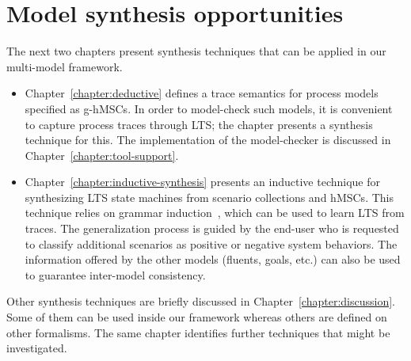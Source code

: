 \section{Model synthesis opportunities\label{section:background-discussion}}

The next two chapters present synthesis techniques that can be applied in our multi-model framework. 

\begin{itemize}
\item Chapter~\ref{chapter:deductive} defines a trace semantics for process models specified as g-hMSCs. In order to model-check such models, it is convenient to capture process traces through LTS; the chapter presents a synthesis technique for this. The implementation of the model-checker is discussed in Chapter~\ref{chapter:tool-support}.
\item Chapter~\ref{chapter:inductive-synthesis} presents an inductive technique for synthesizing LTS state machines from scenario collections and hMSCs. This technique relies on grammar induction~\cite{Gold:1978}, which can be used to learn LTS from traces. The generalization process is guided by the end-user who is requested to classify additional scenarios as positive or negative system behaviors. The information offered by the other models (fluents, goals, etc.) can also be used to guarantee inter-model consistency. 
\end{itemize}

Other synthesis techniques are briefly discussed in Chapter~\ref{chapter:discussion}. Some of them can be used inside our framework whereas others are defined on other formalisms. The same chapter identifies further techniques that might be investigated.
